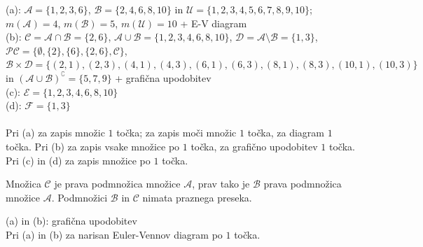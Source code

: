\documentclass[addpoints]{exam}
\begin{document}
\begin{questions}
    \begin{solution}[12cm]
        (a): $\mathcal{A}=\{1,2,3,6\}$, $\mathcal{B}=\{2,4,6,8,10\}$ in $\mathcal{U}=\{1,2,3,4,5,6,7,8,9,10\}$; $m(\mathcal{A})=4$, $m(\mathcal{B})=5$, $m(\mathcal{U})=10$ + E-V diagram \\
        (b): $\mathcal{C}=\mathcal{A}\cap\mathcal{B}=\{2,6\}$, $\mathcal{A}\cup\mathcal{B}=\{1,2,3,4,6,8,10\}$, $\mathcal{D}=\mathcal{A}\setminus\mathcal{B}=\{1,3\}$, $\mathcal{PC}=\{\emptyset,\{2\},\{6\},\{2,6\},\mathcal{C}\}$, $\mathcal{B}\times\mathcal{D}=\{(2,1),(2,3),(4,1),(4,3),(6,1),(6,3),(8,1),(8,3),(10,1),(10,3)\}$ in $(\mathcal{A}\cup\mathcal{B})^\complement=\{5,7,9\}$ + grafična upodobitev\\
        (c): $\mathcal{E}=\{1,2,3,4,6,8,10\}$ \\
        (d): $\mathcal{F}=\{1,3\}$ \\ \\
        Pri (a) za zapis množic $1$ točka; za zapis moči množic $1$ točka, za diagram $1$ točka. Pri (b) za zapis vsake množice po $1$ točka, za grafično upodobitev $1$ točka. Pri (c) in (d) za zapis množice po $1$ točka.
    \end{solution}



    \question
    Množica $\mathcal{C}$ je prava podmnožica množice $\mathcal{A}$, prav tako je $\mathcal{B}$ prava podmnožica množice $\mathcal{A}$. Podmnožici $\mathcal{B}$ in $\mathcal{C}$ nimata praznega preseka.

    \begin{solution}[8cm]
        (a) in (b): grafična upodobitev \\
        Pri (a) in (b) za narisan Euler-Vennov diagram po $1$ točka.
    \end{solution}





\end{questions}
\end{document}
